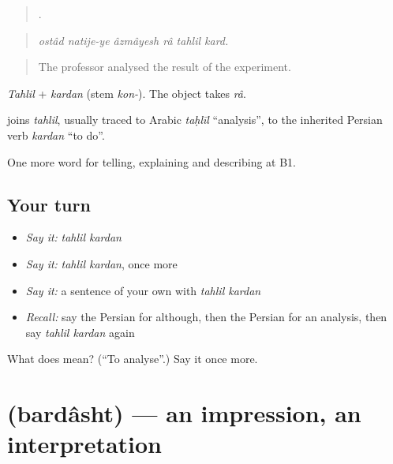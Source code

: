 \begin{quote}
     .
\end{quote}

\begin{quote}
\emph{ostâd natije-ye âzmâyesh râ tahlil kard.}
\end{quote}

\begin{quote}
The professor analysed the result of the experiment.
\end{quote}

\emph{Tahlil} + \emph{kardan} (stem \emph{kon-}). The object takes \emph{râ}.

\begin{cousinweb}
\textbf{ } joins \emph{tahlil}, usually traced to Arabic \emph{taḥlīl} \textquotedblleft{}analysis\textquotedblright{}, to the inherited Persian verb \emph{kardan} \textquotedblleft{}to do\textquotedblright{}.
\end{cousinweb}

\begin{grammarlens}[title={What you've built}]
One more word for telling, explaining and describing at B1.
\end{grammarlens}

\subsection*{Your turn}
\begin{itemize}
\raggedright
  \item \emph{Say it:} \emph{tahlil kardan}
  \item \emph{Say it:} \emph{tahlil kardan}, once more
  \item \emph{Say it:} a sentence of your own with \emph{tahlil kardan}
  \item \emph{Recall:} say the Persian for although, then the Persian for an analysis, then say \emph{tahlil kardan} again
\end{itemize}

\begin{tcolorbox}[breakable,colback=teal!4,colframe=teal!35!black,title={Before you move on}]
What does   mean? (\textquotedblleft{}To analyse\textquotedblright{}.) Say it once more.
\end{tcolorbox}
\section[\texorpdfstring{\fa{برداشت} (bardâsht)}{برداشت (bardâsht)}]{ (bardâsht) — an impression, an interpretation}

